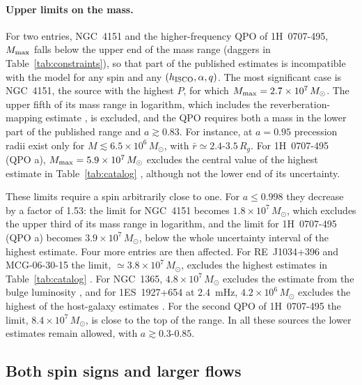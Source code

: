 \paragraph{Upper limits on the mass.}
For two entries, NGC~4151 and the higher-frequency QPO of 1H~0707-495, $M_\textup{max}$ falls below the upper end of the mass range (daggers in Table~\ref{tab:constraints}), so that part of the published estimates is incompatible with the model for any spin and any $(h_\textup{ISCO},\alpha, q)$.
The most significant case is NGC~4151, the source with the highest $P$, for which $M_\textup{max}=2.7\times10^7\,M_\odot$.
The upper fifth of its mass range in logarithm, which includes the reverberation-mapping estimate \citep{Bentz2006}, is excluded, and the QPO requires both a mass in the lower part of the published range and $a\gtrsim0.83$.
For instance, at $a=0.95$ precession radii exist only for $M\lesssim6.5\times10^6\,M_\odot$, with $\bar r\simeq2.4$-$3.5\,R_g$.
For 1H~0707-495 (QPO a), $M_\textup{max}=5.9\times10^7\,M_\odot$ excludes the central value of the highest estimate in Table~\ref{tab:catalog} \citep{Titarchuk2025}, although not the lower end of its uncertainty.

These limits require a spin arbitrarily close to one.
For $a\leq0.998$ they decrease by a factor of 1.53: the limit for NGC~4151 becomes $1.8\times10^7\,M_\odot$, which excludes the upper third of its mass range in logarithm, and the limit for 1H~0707-495 (QPO a) becomes $3.9\times10^7\,M_\odot$, below the whole uncertainty interval of the highest estimate.
Four more entries are then affected.
For RE~J1034+396 and MCG-06-30-15 the limit, $\simeq3.8\times10^7\,M_\odot$, excludes the highest estimates in Table~\ref{tab:catalog} \citep{Czerny2016,Das2025}.
For NGC~1365, $4.8\times10^7\,M_\odot$ excludes the estimate from the bulge luminosity \citep{Risaliti2009}, and for 1ES~1927+654 at 2.4~mHz, $4.2\times10^6\,M_\odot$ excludes the highest of the host-galaxy estimates \citep{Li2022}.
For the second QPO of 1H~0707-495 the limit, $8.4\times10^7\,M_\odot$, is close to the top of the range.
In all these sources the lower estimates remain allowed, with $a\gtrsim0.3$-$0.85$.


\subsection{Both spin signs and larger flows}
\label{sec3:lowP}

